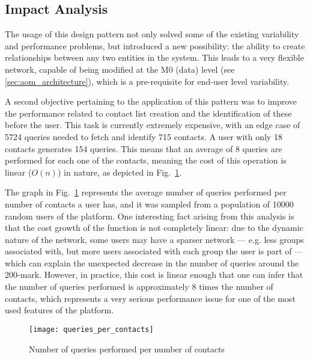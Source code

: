 \subsection{Impact Analysis}\label{sec:fa_social_network_impact_analysis}

The usage of this design pattern not only solved some of the existing variability and performance problems, but introduced a new possibility: the ability to create relationships between any two entities in the system. This leads to a very flexible network, capable of being modified at the M0 (data) level (see \ref{sec:aom_architecture}), which is a pre-requisite for end-user level variability.

A second objective pertaining to the application of this pattern was to improve the performance related to contact list creation and the identification of these before the user. This task is currently extremely expensive, with an edge case of 5724 queries needed to fetch and identify 715 contacts. A user with only 18 contacts generates 154 queries. This means that an average of 8 queries are performed for each one of the contacts, meaning the cost of this operation is linear ($O(n)$) in nature, as depicted in Fig.~\ref{fig:queries_per_contacts}. 

The graph in Fig.~\ref{fig:queries_per_contacts} represents the average number of queries performed per number of contacts a user has, and it was sampled from a population of 10000 random users of the platform. One interesting fact arising from this analysis is that the cost growth of the function is not completely linear: due to the dynamic nature of the network, some users may have a sparser network --- e.g. less groups associated with, but more users associated with each group the user is part of --- which can explain the unexpected decrease in the number of queries around the 200-mark. However, in practice, this cost is linear enough that one can infer that the number of queries performed is approximately 8 times the number of contacts, which represents a very serious performance issue for one of the most used features of the platform.


\begin{figure}[H]
  \centering
  \texttt{[image: queries\_per\_contacts]}
  \caption{Number of queries performed per number of contacts}
  \label{fig:queries_per_contacts}
\end{figure}

